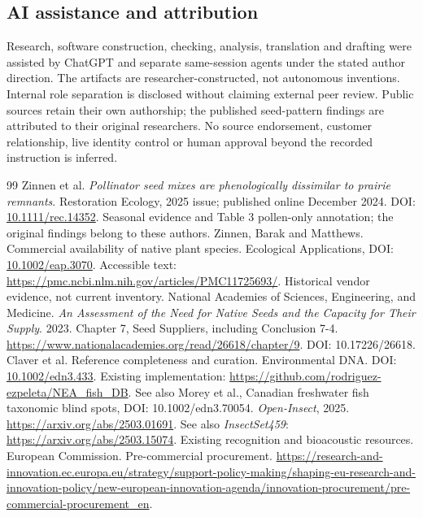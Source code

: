 \documentclass[11pt]{article}
\begin{document}
\subsection*{AI assistance and attribution}
Research, software construction, checking, analysis, translation and drafting were assisted by ChatGPT and separate same-session agents under the stated author direction. The artifacts are researcher-constructed, not autonomous inventions. Internal role separation is disclosed without claiming external peer review. Public sources retain their own authorship; the published seed-pattern findings are attributed to their original researchers. No source endorsement, customer relationship, live identity control or human approval beyond the recorded instruction is inferred.

\begin{thebibliography}{99}
\small
{} Zinnen et al. \emph{Pollinator seed mixes are phenologically dissimilar to prairie remnants}. Restoration Ecology, 2025 issue; published online December 2024. DOI: \href{https://doi.org/10.1111/rec.14352}{10.1111/rec.14352}. Seasonal evidence and Table 3 pollen-only annotation; the original findings belong to these authors.
 Zinnen, Barak and Matthews. Commercial availability of native plant species. Ecological Applications, DOI: \href{https://doi.org/10.1002/eap.3070}{10.1002/eap.3070}. Accessible text: \url{https://pmc.ncbi.nlm.nih.gov/articles/PMC11725693/}. Historical vendor evidence, not current inventory.
 National Academies of Sciences, Engineering, and Medicine. \emph{An Assessment of the Need for Native Seeds and the Capacity for Their Supply}. 2023. Chapter 7, Seed Suppliers, including Conclusion 7-4. \url{https://www.nationalacademies.org/read/26618/chapter/9}. DOI: 10.17226/26618.
 Claver et al. Reference completeness and curation. Environmental DNA. DOI: \href{https://doi.org/10.1002/edn3.433}{10.1002/edn3.433}. Existing implementation: \url{https://github.com/rodriguez-ezpeleta/NEA_fish_DB}. See also Morey et al., Canadian freshwater fish taxonomic blind spots, DOI: 10.1002/edn3.70054.
 \emph{Open-Insect}, 2025. \url{https://arxiv.org/abs/2503.01691}. See also \emph{InsectSet459}: \url{https://arxiv.org/abs/2503.15074}. Existing recognition and bioacoustic resources.
 European Commission. Pre-commercial procurement. \url{https://research-and-innovation.ec.europa.eu/strategy/support-policy-making/shaping-eu-research-and-innovation-policy/new-european-innovation-agenda/innovation-procurement/pre-commercial-procurement_en}.

\end{thebibliography}
\end{document}
